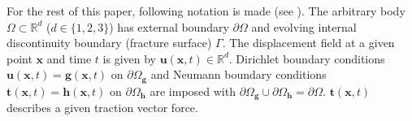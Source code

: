 For the rest of this paper, following notation is made (see ). The arbitrary body $\Omega\subset\mathbb{R}^{d}$ ($d\in\{1,2,3\}$) has external boundary $\partial\Omega$ and evolving internal discontinuity boundary (fracture surface) $\Gamma$. The displacement field at a given point $\mathbf{x}$ and time $t$ is given by $\mathbf{u}\left(\mathbf{x},t\right)\in\mathbb{R}^{d}$. Dirichlet boundary conditions $\mathbf{u}\left(\mathbf{x},t\right)=\mathbf{g}\left(\mathbf{x},t\right)$ on $\partial\Omega_{\mathbf{g}}$ and Neumann boundary conditions $\mathbf{t}\left(\mathbf{x},t\right)=\mathbf{h}\left(\mathbf{x},t\right)$ on $\partial\Omega_{\mathbf{h}}$ are imposed with $\partial\Omega_{\mathbf{g}}\cup\partial\Omega_{\mathbf{h}}=\partial\Omega$. $\mathbf{t}\left(\mathbf{x},t\right)$ describes a given traction vector force.

